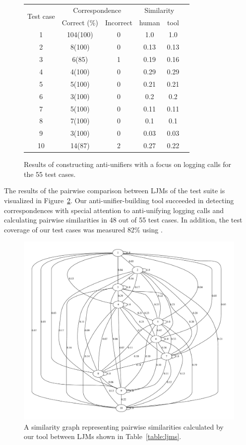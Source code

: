  
\begin{figure}
  \centering
  \begin{tabular}{|c|c|c|c|c|c|}
    \hline
    \multirow{2}{*}{Test case}&\multicolumn{2}{c|}{Correspondence}&\multicolumn{2}{c|}{Similarity}\\
    \cline{2-5}
    &Correct (\%)&Incorrect&human&tool\\
    \hline
    1&104(100)&0& 1.0 & 1.0\\
    \hline
    2&8(100)&0& 0.13& 0.13\\
    \hline
    3&6(85)&1&0.19& 0.16\\
    \hline
    4&4(100)&0&0.29 &0.29\\
    \hline
    5&5(100)&0&0.21 &0.21\\
    \hline
    6&3(100)&0&0.2 &0.2\\
    \hline
    7&5(100)&0&0.11 &0.11\\
    \hline
    8&7(100)&0& 0.1&0.1\\
    \hline
    9&3(100)&0&0.03&0.03 \\
    \hline
    10&14(87)&2&0.27 &0.22\\
    \hline
   
  \end{tabular}
  \caption{Results of constructing anti-unifiers with a focus on logging calls for the 55 test cases.}
  \label{study2_test_cases_results}
\end{figure}
 
The results of the pairwise comparison between LJMs of the test suite is visualized in Figure~\ref{fig:au_graph}. Our anti-unifier-building tool succeeded in detecting correspondences with special attention to anti-unifying logging calls and calculating pairwise similarities in 48 out of 55 test cases. In addition, the test coverage of our test cases was measured 82\% using .

\begin{figure} [H]
  \centering\includegraphics [width = \textwidth]{graphviz/au.pdf}
  \caption{A similarity graph representing pairwise similarities calculated by our tool between LJMs shown in Table~\ref{table:ljms}.}
  \label{fig:au_graph}
\end{figure}


